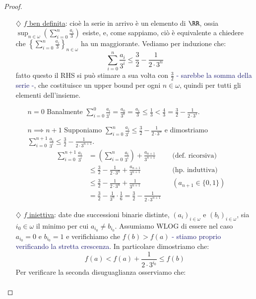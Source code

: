 \begin{proof}
	\begin{itemize}
		\item[$\diamondsuit$] \underline{$f$ ben definita}: cioè la serie in arrivo è un elemento di $\RR$, ossia $\sup_{n \in \omega}\left(\sum_{i = 0}^n \frac{a_i}{3}\right)$ esiste,
		e, come sappiamo, ciò è equivalente a chiedere che $\left\{\sum_{i = 0}^n \frac{a_i}{3}\right\}_{n \in \omega}$ ha un maggiorante. Vediamo per induzione che:
		\[ \sum_{i = 0}^n \frac{a_i}{3^i} \leq \frac 32 - \frac{1}{2 \cdot 3^n}
			\]
		fatto questo il RHS si può stimare a sua volta con $\frac 32$ \textcolor{MidnightBlue}{- sarebbe la somma della serie -}, che costituisce un upper bound per ogni $n \in \omega$, quindi per tutti gli elementi dell'insieme.
		\begin{itemize}
			\item[$\boxed{n = 0}$] Banalmente $ \sum_{i = 0}^0 \frac{a_i}{3^i} = \frac{a_0}{3^0} = \frac{a_1}{3} \leq \frac 13 < \frac 43 = \frac 32 - \frac{1}{2 \cdot 3^1}$.
			\item[$\boxed{n \implies n + 1}$] Supponiamo $\sum_{i = 0}^n \frac{a_i}{3^i} \leq \frac 32 - \frac{1}{2 \cdot 3^n}$ e dimostriamo $\sum_{i = 0}^{n+1} \frac{a_i}{3^i} \leq \frac 32 - \frac{1}{2 \cdot 3^{n+1}}$.
			\begin{align*}
				\sum_{i = 0}^{n+1} \frac{a_i}{3^i} &= \left(\sum_{i = 0}^{n} \frac{a_i}{3^i}\right) + \frac{a_{n+1}}{3^{n+1}} &&\text{(def. ricorsiva)} \\
												   &\leq \frac 32 - \frac{1}{2 \cdot 3^n} + \frac{a_{n+1}}{3^{n+1}} &&\text{(hp. induttiva)} \\
												   &\leq \frac 32 - \frac{1}{2 \cdot 3^n} + \frac{1}{3^{n+1}} &&(a_{n+1} \in \{0,1\}) \\
												   &= \frac 32 - \frac{1}{3^n} \cdot \frac 16 = \frac 32 - \frac{1}{2 \cdot 3^{n+1}}
			\end{align*}
		\end{itemize}
		\item[$\diamondsuit$] \underline{$f$ iniettiva}: date due successioni binarie distinte, $(a_i)_{i \in \omega}$ e $(b_i)_{i \in \omega}$, sia $i_0 \in \omega$ il minimo per cui $a_{i_0} \ne b_{i_0}$. Assumiamo WLOG di essere nel caso $a_{i_0} = 0$ e $b_{i_0} = 1$ e 
		verifichiamo che $f(b) > f(a)$ \textcolor{MidnightBlue}{- stiamo proprio verificando la stretta crescenza}. In particolare dimostriamo che:
		\[ f(a) < f(a) + \frac{1}{2 \cdot 3^{i_0}} \leq f(b)
			\]
		Per verificare la seconda disuguaglianza osserviamo che:
		\begin{align*}

\end{align*}
\end{itemize}
\end{proof}
